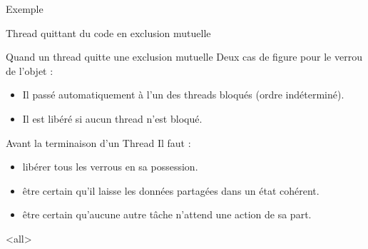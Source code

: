 \begin{frame}[fragile]{Exemple}
\end{frame}

\begin{frame}{Thread quittant du code en exclusion mutuelle}
  
  \begin{block}{Quand un thread quitte une exclusion mutuelle}
    Deux cas de figure pour le verrou de l'objet :
    \begin{itemize}
    \item  Il  passé  automatiquement à  l'un  des threads  bloqués
      (ordre indéterminé).
    \item Il est libéré si aucun thread n'est bloqué.
    \end{itemize}
  \end{block}
 
  \bigskip
  
  \begin{alertblock}{Avant la terminaison d'un Thread}
    Il faut :
    \begin{itemize}
    \item \alert{libérer tous les verrous en sa possession.}
    \item être certain qu'il laisse les données partagées dans un état cohérent.
    \item être certain qu'aucune autre tâche n'attend une action de sa part.
    \end{itemize}
  \end{alertblock}
\end{frame}

\mode<all>
